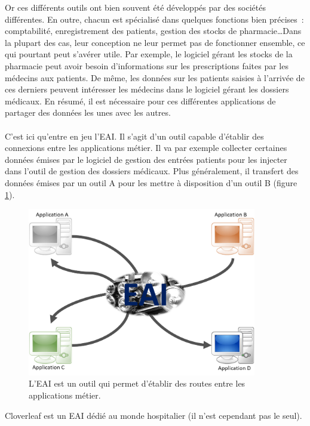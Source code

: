 			Or ces différents outils ont bien souvent été développés par des sociétés
			différentes. En outre, chacun est spécialisé dans quelques fonctions
			bien précises~: comptabilité, enregistrement des patients, gestion des
			stocks de pharmacie\ldots Dans la plupart des cas, leur conception ne leur
			permet pas de fonctionner ensemble, ce qui pourtant peut s'avérer utile. Par
			exemple, le logiciel gérant les stocks de la pharmacie peut avoir besoin
			d'informations sur les prescriptions faites par les médecins aux patients. De
			même, les données sur les patients saisies à l'arrivée de ces derniers
			peuvent intéresser les médecins dans le logiciel gérant les dossiers
			médicaux. En résumé, il est nécessaire pour ces différentes applications de
			partager des données les unes avec les autres.
			
			\paragraph{}%
			C'est ici qu'entre en jeu l'EAI. Il s'agit d'un outil capable d'établir des
			connexions entre les applications métier. Il va par exemple collecter
			certaines données émises par le logiciel de gestion des entrées patients
			pour les injecter dans l'outil de gestion des dossiers médicaux. Plus
			généralement, il transfert des données émises par un outil A pour les
			mettre à disposition d'un outil B (figure \ref{intro_interop}).
			\begin{figure}[H]
				\centering
				\includegraphics[width=10cm]{../img/eai_1.png}
				\caption{\label{intro_interop} L'EAI est un outil qui permet
				d'établir des routes entre les applications métier.}
			\end{figure}
			Cloverleaf est un EAI dédié au monde hospitalier (il n'est cependant pas le
			seul).
			

